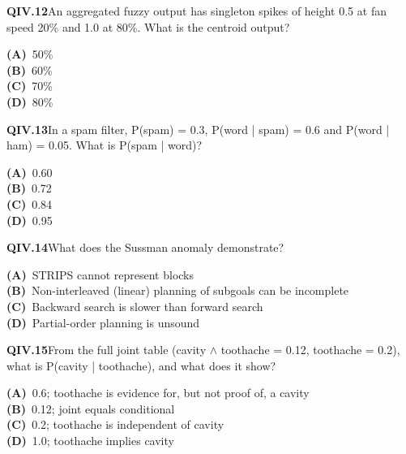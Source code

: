 \documentclass[11pt]{article}
\begin{document}
\begin{tcolorbox}[enhanced,breakable,colback=white,colframe=navyL,arc=2mm,boxrule=0.7pt,left=3mm,right=3mm,top=2mm,bottom=2mm]
\textbf{\color{navy}QIV.12}\quad An aggregated fuzzy output has singleton spikes of height 0.5 at fan speed 20\% and 1.0 at 80\%. What is the centroid output?\hfill{}\par\smallskip
{\small \textbf{\color{navyL}(A)}\ 50\%\\[1pt]\textbf{\color{navyL}(B)}\ 60\%\\[1pt]\textbf{\color{navyL}(C)}\ 70\%\\[1pt]\textbf{\color{navyL}(D)}\ 80\%}
\end{tcolorbox}
\begin{tcolorbox}[enhanced,breakable,colback=white,colframe=navyL,arc=2mm,boxrule=0.7pt,left=3mm,right=3mm,top=2mm,bottom=2mm]
\textbf{\color{navy}QIV.13}\quad In a spam filter, P(spam) = 0.3, P(word | spam) = 0.6 and P(word | ham) = 0.05. What is P(spam | word)?\hfill{}\par\smallskip
{\small \textbf{\color{navyL}(A)}\ 0.60\\[1pt]\textbf{\color{navyL}(B)}\ 0.72\\[1pt]\textbf{\color{navyL}(C)}\ 0.84\\[1pt]\textbf{\color{navyL}(D)}\ 0.95}
\end{tcolorbox}
\begin{tcolorbox}[enhanced,breakable,colback=white,colframe=navyL,arc=2mm,boxrule=0.7pt,left=3mm,right=3mm,top=2mm,bottom=2mm]
\textbf{\color{navy}QIV.14}\quad What does the Sussman anomaly demonstrate?\hfill{}\par\smallskip
{\small \textbf{\color{navyL}(A)}\ STRIPS cannot represent blocks\\[1pt]\textbf{\color{navyL}(B)}\ Non-interleaved (linear) planning of subgoals can be incomplete\\[1pt]\textbf{\color{navyL}(C)}\ Backward search is slower than forward search\\[1pt]\textbf{\color{navyL}(D)}\ Partial-order planning is unsound}
\end{tcolorbox}
\begin{tcolorbox}[enhanced,breakable,colback=white,colframe=navyL,arc=2mm,boxrule=0.7pt,left=3mm,right=3mm,top=2mm,bottom=2mm]
\textbf{\color{navy}QIV.15}\quad From the full joint table (cavity $\wedge$ toothache = 0.12, toothache = 0.2), what is P(cavity | toothache), and what does it show?\hfill{}\par\smallskip
{\small \textbf{\color{navyL}(A)}\ 0.6; toothache is evidence for, but not proof of, a cavity\\[1pt]\textbf{\color{navyL}(B)}\ 0.12; joint equals conditional\\[1pt]\textbf{\color{navyL}(C)}\ 0.2; toothache is independent of cavity\\[1pt]\textbf{\color{navyL}(D)}\ 1.0; toothache implies cavity}
\end{tcolorbox}
\newpage
\end{document}

